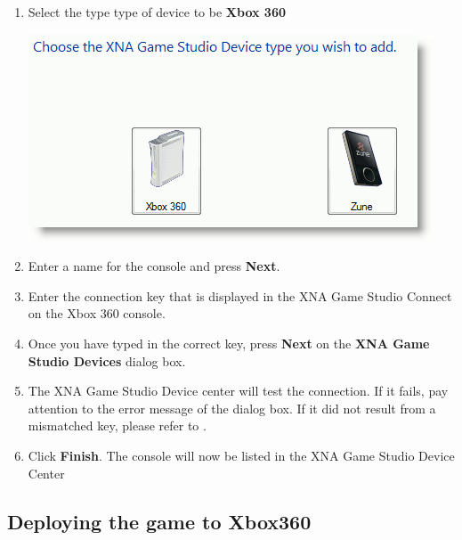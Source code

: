 \begin{enumerate}
	\item Select the type type of device to be \textbf{Xbox 360} \\ \begin{center}\includegraphics[scale=0.75]{graphics/type_of_device}\end{center} 
	\item Enter a name for the console and press \textbf{Next}. 
	\item Enter the connection key that is displayed in the XNA Game Studio Connect on the Xbox 360 console. 
	\item Once you have typed in the correct key, press \textbf{Next} on the \textbf{XNA Game Studio Devices} dialog box. 
	\item The XNA Game Studio Device center will test the connection. If it fails, pay attention to the error message of the dialog box. If it did not result from a mismatched key, please refer to \cite{troubleshoot}. 
	\item Click \textbf{Finish}. The console will now be listed in the XNA Game Studio Device Center  
\end{enumerate}

\subsection{Deploying the game to Xbox360}

